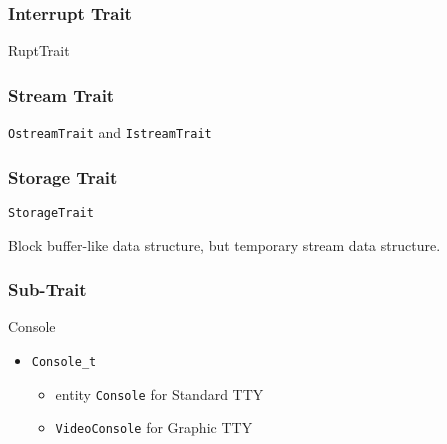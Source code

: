 \subsubsection{Interrupt Trait}

RuptTrait


\subsubsection{Stream Trait}

\verb`OstreamTrait` and \verb`IstreamTrait`

\subsubsection{Storage Trait}

\verb`StorageTrait`

Block buffer-like data structure, but temporary stream data structure.

\subsubsection{Sub-Trait}

Console
\begin{itemize}
\item \verb`Console_t`
	\begin{itemize}
	\item entity \verb`Console` for Standard TTY
	\item \verb`VideoConsole` for Graphic TTY
	\end{itemize}
\end{itemize}


